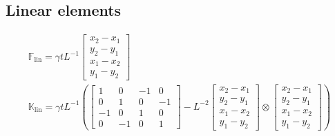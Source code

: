 \documentclass[a4paper,11pt]{article}
\renewcommand{\to}[1]{\text{\boldmath $#1$}} %
\newcommand{\uv}[1]{\mathds{#1}}
\newcommand{\um}[1]{\mathds{#1}}
\newcommand{\linear}{\mathrm{lin}}
\begin{document}
\subsection{Linear elements}
\begin{gather}
 \uv F_\linear = \gamma t L^{-1} \begin{bmatrix}x_2-x_1\\y_2-y_1\\x_1-x_2\\y_1-y_2\end{bmatrix}\\
 \um K_\linear = \gamma t L^{-1}\left(
	\begin{bmatrix}1&0&-1&0\\0&1&0&-1\\-1&0&1&0\\0&-1&0&1\end{bmatrix}-
	L^{-2}\begin{bmatrix}x_2-x_1\\y_2-y_1\\x_1-x_2\\y_1-y_2\end{bmatrix}\otimes\begin{bmatrix}x_2-x_1\\y_2-y_1\\x_1-x_2\\y_1-y_2\end{bmatrix}
  \right)
\end{gather}
\end{document}
